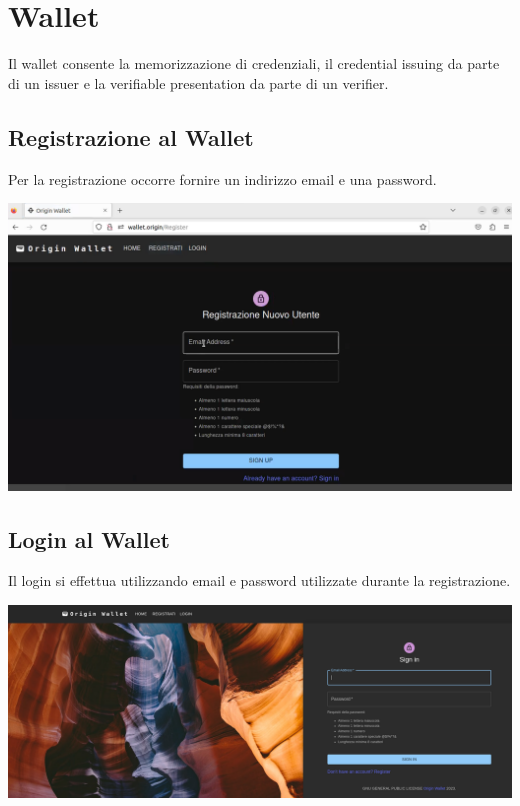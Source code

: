 \section{Wallet}
Il wallet consente la memorizzazione di credenziali, il credential issuing da parte di un issuer e la verifiable presentation da parte di un verifier.

\subsection{Registrazione al Wallet}
Per la registrazione occorre fornire un indirizzo email e una password.
\begin{center}
\includegraphics[scale = 0.2]{./res/img/wallet/new/wallet_register.png}
\end{center}

\subsection{Login al Wallet}
Il login si effettua utilizzando email e password utilizzate durante la registrazione.
\begin{center}
\includegraphics[scale = 0.9]{./res/img/wallet/new/wallet_login.png}
\end{center}

